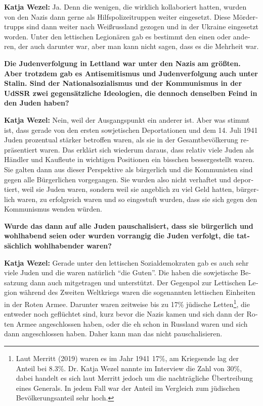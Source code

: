 \begin{otherlanguage}{ngerman}
\textbf{Katja Wezel:} Ja. Denn die wenigen, die wirklich kollaboriert hatten, wurden von den Nazis dann gerne als Hilfspolizeitruppen weiter eingesetzt. Diese Mördertrupps sind dann weiter nach Weißrussland gezogen und in der Ukraine eingesetzt worden. Unter den lettischen Legionären gab es bestimmt den einen oder anderen, der auch darunter war, aber man kann nicht sagen, dass es die Mehrheit war.

\textbf{Die Judenverfolgung in Lettland war unter den Nazis am größten. Aber trotzdem gab es Antisemitismus und Judenverfolgung auch unter Stalin. Sind der Nationalsozialismus und der Kommunismus in der UdSSR zwei gegensätzliche Ideologien, die dennoch denselben Feind in den Juden haben?}

\textbf{Katja Wezel:} Nein, weil der Ausgangspunkt ein anderer ist. Aber was stimmt ist, dass gerade von den ersten sowjetischen Deportationen und dem 14. Juli 1941 Juden prozentual stärker betroffen waren, als sie in der Gesamtbevölkerung repräsentiert waren. Das erklärt sich wiederum daraus, dass relativ viele Juden als Händler und Kaufleute in wichtigen Positionen ein bisschen bessergestellt waren. Sie galten dann aus dieser Perspektive als bürgerlich und die Kommunisten sind gegen alle Bürgerlichen vorgegangen. Sie wurden also nicht verhaftet und deportiert, weil sie Juden waren, sondern weil sie angeblich zu viel Geld hatten, bürgerlich waren, zu erfolgreich waren und so eingestuft wurden, dass sie sich gegen den Kommunismus wenden würden. 

\textbf{Wurde das dann auf alle Juden pauschalisiert, dass sie bürgerlich und wohlhabend seien oder wurden vorrangig die Juden verfolgt, die tatsächlich wohlhabender waren?} 

\textbf{Katja Wezel:} Gerade unter den lettischen Sozialdemokraten gab es auch sehr viele Juden und die waren natürlich "`die Guten"'. Die haben die sowjetische Besatzung dann auch mitgetragen und unterstützt. Der Gegenpol zur Lettischen Legion während des Zweiten Weltkriegs waren die sogenannten lettischen Einheiten in der Roten Armee. Darunter waren zeitweise bis zu 17\% jüdische Letten\footnote{Laut Merritt (2019) waren es im Jahr 1941 17\%, am Kriegsende lag der Anteil bei 8.3\%. Dr. Katja Wezel nannte im Interview die Zahl von 30\%, dabei handelt es sich laut Merritt jedoch um die nachträgliche Übertreibung eines Generals. In jedem Fall war der Anteil im Vergleich zum jüdischen Bevölkerungsanteil sehr hoch.}, die entweder noch geflüchtet sind, kurz bevor die Nazis kamen und sich dann der Roten Armee angeschlossen haben, oder die eh schon in Russland waren und sich dann angeschlossen haben. Daher kann man das nicht pauschalisieren. 


\end{otherlanguage}
